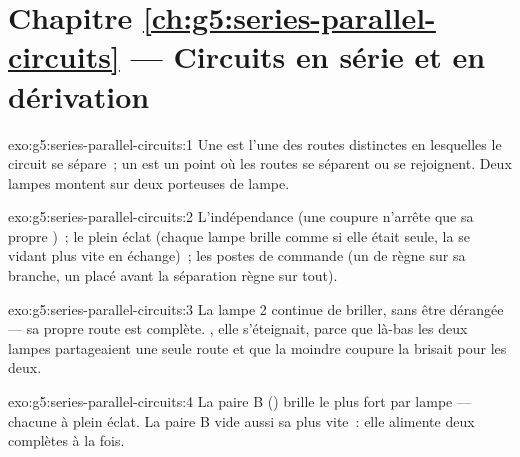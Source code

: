 \section*{Chapitre \ref{ch:g5:series-parallel-circuits} --- Circuits en série et en dérivation}

\begin{solution}{exo:g5:series-parallel-circuits:1}
Une  est l'une des routes distinctes en lesquelles le circuit
se sépare~; un  est un point où les routes se séparent ou se
rejoignent. Deux lampes  montent sur deux 
porteuses de lampe.
\end{solution}

\begin{solution}{exo:g5:series-parallel-circuits:2}
L'indépendance (une coupure n'arrête que sa propre )~; le
plein éclat (chaque lampe brille comme si elle était seule, la 
se vidant plus vite en échange)~; les postes de commande (un
 de  règne sur sa branche, un  placé
avant la séparation règne sur tout).
\end{solution}

\begin{solution}{exo:g5:series-parallel-circuits:3}
La lampe 2 continue de briller, sans être dérangée --- sa propre
route est complète. , elle s'éteignait, parce que là-bas les
deux lampes partageaient une seule route et que la moindre coupure la
brisait pour les deux.
\end{solution}

\begin{solution}{exo:g5:series-parallel-circuits:4}
La paire B () brille le plus fort par lampe --- chacune
à plein éclat. La paire B vide aussi sa  plus vite~: elle
alimente deux  complètes à la fois.
\end{solution}

